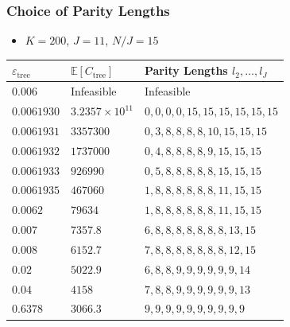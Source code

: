 \documentclass[10pt]{beamer}
\begin{document}
\begin{frame}
\frametitle{Choice of Parity Lengths}
\begin{itemize}
\item $K=200$, $J=11$, $N/J=15$
\end{itemize}
\begin{center}
\begin{tabular}{||l|l|l||}
\hline
 $\varepsilon_{\mathrm{tree}}$ & $\mathbb{E}[C_{\mathrm{tree}}]$ & Parity Lengths $l_2, \ldots, l_J$ \\ [0.5ex]
\hline \hline
$0.006$ & Infeasible & Infeasible \\
\hline
$0.0061930$ & $3.2357\times10^{11}$ & $ 0 ,0, 0, 0, 15, 15, 15, 15, 15, 15$ \\
\hline
$0.0061931$ & $3357300$ & $ 0, 3, 8, 8, 8, 8, 10, 15, 15, 15$ \\
\hline
$0.0061932$ & $1737000$ & $ 0, 4, 8, 8, 8, 8, 9, 15, 15, 15$ \\
\hline
$0.0061933$ & $926990$ & $ 0, 5, 8, 8, 8, 8, 8, 15, 15, 15$ \\
\hline
$0.0061935$ & $467060$ & $ 1, 8, 8, 8, 8, 8, 8, 11, 15, 15$ \\
\hline
$0.0062$ & $79634$ & $ 1, 8, 8, 8, 8, 8, 8, 11, 15, 15$ \\
\hline
$0.007$ & $7357.8$ & $ 6, 8, 8, 8, 8, 8, 8, 8, 13, 15$ \\
\hline
$0.008$ & $6152.7$ & $ 7, 8, 8, 8, 8, 8, 8, 8, 12, 15$ \\
\hline
$0.02$ & $5022.9$ & $ 6, 8, 8, 9, 9, 9, 9, 9, 9, 14$ \\
\hline
$0.04$ & $4158$ & $ 7, 8, 8, 9, 9, 9, 9, 9, 9, 13$ \\
\hline
$0.6378$ & $3066.3$ & $ 9, 9, 9, 9, 9, 9, 9, 9, 9, 9$ \\ [1ex]
\hline
\end{tabular}
\end{center}
\end{frame}
\end{document}
